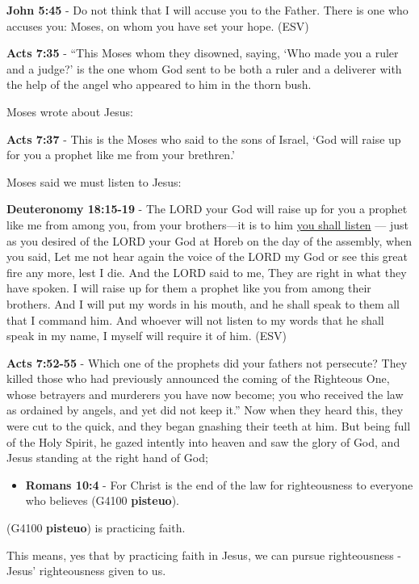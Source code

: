 \documentclass[11pt]{article}
\begin{document}
\textbf{John 5:45} -  Do not think that I will accuse you to the Father.  There is one who accuses you: Moses, on whom you have set your hope.  (ESV)

\textbf{Acts 7:35} - “This Moses whom they disowned, saying, ‘Who made you a ruler and a judge?’ is the one whom God sent to be both a ruler and a deliverer with the help of the angel who appeared to him in the thorn bush.

Moses wrote about Jesus:

\textbf{Acts 7:37} - This is the Moses who said to the sons of Israel, ‘God will raise up for you a prophet like me from your brethren.’

Moses said we must listen to Jesus:

\textbf{Deuteronomy 18:15-19} - The LORD your God will raise up for you a prophet like me from among you, from your brothers—it is to him \uline{you shall listen} — just as you desired of the LORD your God at Horeb on the day of the assembly, when you said, Let me not hear again the voice of the LORD my God or see this great fire any more, lest I die. And the LORD said to me, They are right in what they have spoken. I will raise up for them a prophet like you from among their brothers. And I will put my words in his mouth, and he shall speak to them all that I command him. And whoever will not listen to my words that he shall speak in my name, I myself will require it of him. (ESV)

\textbf{Acts 7:52-55} - Which one of the prophets did your fathers not persecute? They killed those who had previously announced the coming of the Righteous One, whose betrayers and murderers you have now become; you who received the law as ordained by angels, and yet did not keep it.” Now when they heard this, they were cut to the quick, and they began gnashing their teeth at him.  But being full of the Holy Spirit, he gazed intently into heaven and saw the glory of God, and Jesus standing at the right hand of God;

\begin{itemize}
\item \textbf{Romans 10:4} - For Christ is the end of the law for righteousness to everyone who believes (G4100 \textbf{pisteuo}).
\end{itemize}

(G4100 \textbf{pisteuo}) is practicing faith.

This means, yes that by practicing faith in Jesus, we can pursue righteousness - Jesus' righteousness given to us.
\end{document}
